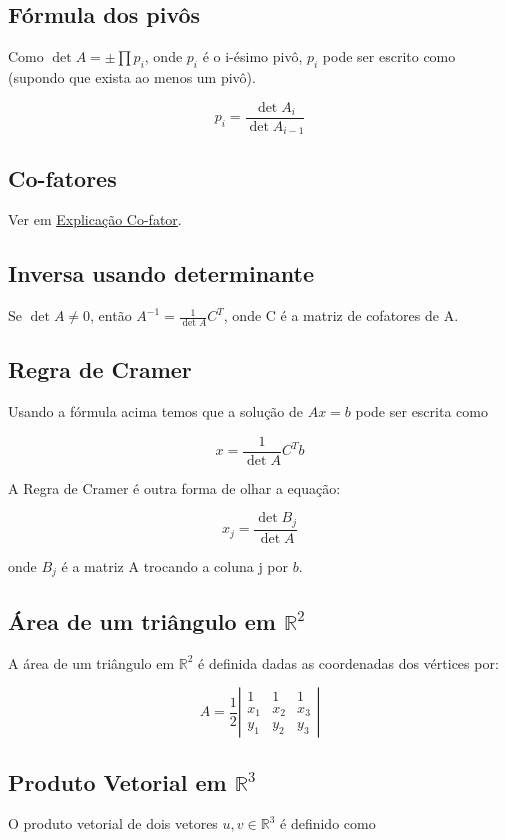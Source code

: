\documentclass[12pt]{article}
\begin{document}
\subsection*{Fórmula dos pivôs}
Como $\det A = \pm \prod p_i$, onde $p_i$ é o i-ésimo pivô, $p_i$ pode ser escrito como (supondo que exista ao menos um pivô).

$$p_i = \dfrac{\det A_i}{\det A_{i-1}}$$

\subsection*{Co-fatores}
Ver em \href{https://www.infoescola.com/matematica/matriz-de-cofatores}{Explicação Co-fator}.

\subsection*{Inversa usando determinante}
Se $\det A \neq 0$, então $A^{-1} = \frac{1}{\det A} C^T$, onde C é a matriz de cofatores de A.

\subsection*{Regra de Cramer}
Usando a fórmula acima temos que a solução de $Ax = b$ pode ser escrita como

$$x = \dfrac{1}{\det A} C^T b$$

A Regra de Cramer é outra forma de olhar a equação:

$$x_j = \dfrac{\det B_j}{\det A}$$

onde $B_j$ é a matriz A trocando a coluna j por $b$.

\subsection*{Área de um triângulo em $\mathbb{R}^2$}
A área de um triângulo em $\mathbb{R}^2$ é definida dadas as coordenadas dos vértices por:

$$A = \dfrac{1}{2} \left| \begin{array}{ccc}
    1 & 1 & 1 \\
    x_1 & x_2 & x_3 \\
    y_1 & y_2 & y_3
\end{array} \right| $$

\subsection*{Produto Vetorial em $\mathbb{R}^3$}
O produto vetorial de dois vetores $u,v \in \mathbb{R}^3$ é definido como
\end{document}
